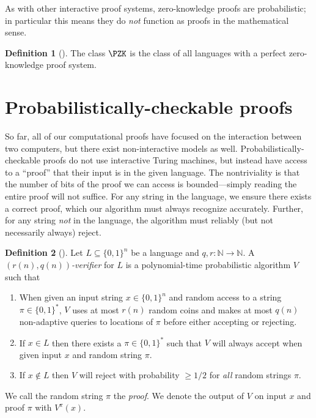 \documentclass[english]{reedthesis}
\theoremstyle{plain}
\theoremstyle{definition}
\newtheorem{defn}[defn]{Definition}
\theoremstyle{remark}
\begin{document}
As with other interactive proof systems, zero-knowledge proofs are
probabilistic; in particular this means they do \emph{not} function as proofs in
the mathematical sense.

\begin{defn}[{\cite[Def.\ 4.3.5]{Go01}}]\label{def:pzk}
  The class $\PZK$ is the class of all languages with a perfect zero-knowledge
  proof system.
\end{defn}


\section{Probabilistically-checkable proofs}\label{sec:pcp}

So far, all of our computational proofs have focused on the interaction between
two computers, but there exist non-interactive models as well.
Probabilistically-checkable proofs do not use interactive Turing machines, but
instead have access to a ``proof'' that their input is in the given language.
The nontriviality is that the number of bits of the proof we can access is
bounded---simply reading the entire proof will not suffice. For any string in the
language, we ensure there exists a correct proof, which our algorithm must
always recognize accurately. Further, for any string \emph{not} in the language,
the algorithm must reliably (but not necessarily always) reject.

\begin{defn}[{\cite[Def.\ 18.1]{AB09}}]\label{def:prob-check}
  Let $L \subseteq \{0, 1\}^{n}$ be a language and $q, r: \mathbb{N} \rightarrow \mathbb{N}$. A
  \emph{$(r(n), q(n))$-verifier} for $L$ is a polynomial-time probabilistic
  algorithm $V$ such that
  \begin{enumerate}
    \item When given an input string $x \in \{0, 1\}^{n}$ and random access to a
          string $\pi \in \{0, 1\}^{*}$, $V$ uses at most $r(n)$ random coins and
          makes at most $q(n)$ non-adaptive queries to locations of $\pi$ before
          either accepting or rejecting.
    \item If $x \in L$ then there exists a $\pi \in \{0, 1\}^{*}$ such that $V$ will
          always accept when given input $x$ and random string $\pi$.
    \item If $x \notin L$ then $V$ will reject with probability $\ge 1/2$ for
          \emph{all} random strings $\pi$.
  \end{enumerate}
  We call the random string $\pi$ the \emph{proof}. We denote the output of $V$ on
  input $x$ and proof $\pi$ with $V^{\pi}(x)$.
\end{defn}
\end{document}

